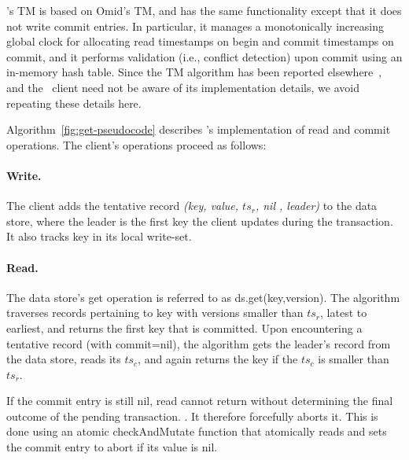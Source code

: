 \sys's TM is based on Omid's TM, and has the same functionality except that it does not write commit entries.
In particular, it manages a monotonically increasing global clock for allocating read timestamps on begin and commit timestamps on commit,
and it performs validation (i.e., conflict detection) upon commit using an in-memory hash table. 
Since the TM algorithm has been reported elsewhere~\cite{omid-fast}, and the \sys\ client need not be aware of 
its implementation details, we avoid repeating these details here. 

Algorithm~\ref{fig:get-pseudocode} describes \sys's implementation of read and commit operations.
The client's operations proceed as follows:

\paragraph{Write.}
The client adds the tentative record \emph{(key, value, $ts_r$, nil , leader)} to the data store, where
the leader is the first key the client updates during the transaction. It also tracks key in its local write-set.

\paragraph{Read.}
The data store's get operation is referred to as ds.get(key,version). The algorithm traverses records pertaining
to key with versions smaller than $ts_r$, latest to earliest, and returns the first key that is committed. Upon
encountering a tentative record (with commit=nil), the algorithm gets the leader's record from the data store,
reads its $ts_c$, and again returns the key if the $ts_c$ is smaller than $ts_r$. 

If the commit entry is still nil, read cannot return without determining the final outcome
of the pending transaction. . 
It  therefore forcefully aborts it. This is done using an atomic 
 {checkAndMutate} function that atomically reads and sets the commit entry to abort if its value is nil.


